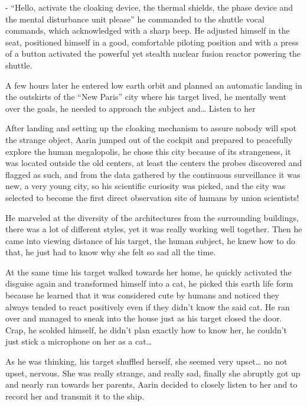 \documentclass[hidelinks,12pt,a4paper]{book}
\begin{document}
- “Hello, activate the cloaking device, the thermal shields, the phase device and the mental disturbance unit please” 
he commanded to the shuttle vocal commands, 
which acknowledged with a sharp beep. 
He adjusted himself in the seat, positioned himself in a good, comfortable piloting position and with a press 
of a button activated the powerful yet stealth nuclear fusion reactor powering the shuttle.\par
\bigskip

A few hours later he entered low earth orbit and planned an automatic landing in the outskirts of the 
“New Paris” city where his target lived, he mentally went over the goals, he needed to approach the 
subject and… Listen to her\par
\bigskip

After landing and setting up the cloaking mechanism to assure nobody will spot the strange object, 
Aarin jumped out of the cockpit and prepared to peacefully explore the human megalopolis, 
he chose this city because of its strangeness, it was located outside the old centers, 
at least the centers the probes discovered and flagged as such, and from the data gathered by the continuous 
surveillance it was new, a very young city, so his scientific curiosity was picked, and the city was selected to 
become the first direct observation site of humans by union scientists!\par
\bigskip

He marveled at the diversity of the architectures from the surrounding buildings, 
there was a lot of different styles, yet it was really working well together. Then he came into viewing distance of his target,
 the human subject, he knew how to do that, he just had to know why she felt so sad all the time. \par
 \bigskip

At the same time his target walked towards her home, he quickly activated the disguise again and transformed 
himself into a cat, he picked this earth life form because he learned that it was considered cute by humans and 
noticed they always tended to react positively even if they didn't know the said cat. He ran over and managed to 
sneak into the house just as his target closed the door. Crap, he scolded himself, he didn't plan exactly how to 
know her, he couldn't just stick a microphone on her as a cat… \par
\bigskip

As he was thinking, his target shuffled herself, she seemed very upset… no not upset, nervous. 
She was really strange, and really sad, finally she abruptly got up and nearly ran towards her parents, 
Aarin decided to closely listen to her and to record her and transmit it to the ship.\par
\bigskip
\end{document}

